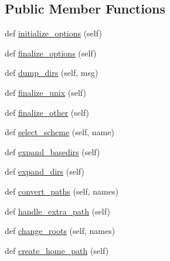 \subsection*{Public Member Functions}
\begin{DoxyCompactItemize}
\item 
def \hyperlink{classsetuptools_1_1__distutils_1_1command_1_1install_1_1install_ad08033d523b4e940dcf2356ae1c72f73}{initialize\+\_\+options} (self)
\item 
def \hyperlink{classsetuptools_1_1__distutils_1_1command_1_1install_1_1install_a57fd33667f362fe438802b3e810249fa}{finalize\+\_\+options} (self)
\item 
def \hyperlink{classsetuptools_1_1__distutils_1_1command_1_1install_1_1install_a20b972307ec79888cfdc313f1ff337c8}{dump\+\_\+dirs} (self, msg)
\item 
def \hyperlink{classsetuptools_1_1__distutils_1_1command_1_1install_1_1install_a87fb2450c2963cc2d94cc4b11f9ae995}{finalize\+\_\+unix} (self)
\item 
def \hyperlink{classsetuptools_1_1__distutils_1_1command_1_1install_1_1install_a416de9ef1a606dbd1366842c6f1dc7c3}{finalize\+\_\+other} (self)
\item 
def \hyperlink{classsetuptools_1_1__distutils_1_1command_1_1install_1_1install_aa23fd0b4b7c4a2e5ef1d720df6d363c6}{select\+\_\+scheme} (self, name)
\item 
def \hyperlink{classsetuptools_1_1__distutils_1_1command_1_1install_1_1install_ab844fb612e71fdc64c8be1126eb63659}{expand\+\_\+basedirs} (self)
\item 
def \hyperlink{classsetuptools_1_1__distutils_1_1command_1_1install_1_1install_adc5a9c1f8999a123bfa6b8045ae00713}{expand\+\_\+dirs} (self)
\item 
def \hyperlink{classsetuptools_1_1__distutils_1_1command_1_1install_1_1install_a2081d4bb6efd2679b4f62a884a1b550b}{convert\+\_\+paths} (self, names)
\item 
def \hyperlink{classsetuptools_1_1__distutils_1_1command_1_1install_1_1install_a10ef32eaccc1b7deb80ae818a51ec96e}{handle\+\_\+extra\+\_\+path} (self)
\item 
def \hyperlink{classsetuptools_1_1__distutils_1_1command_1_1install_1_1install_a74f0fc4bffdbca57c34e331c57f17e05}{change\+\_\+roots} (self, names)
\item 
def \hyperlink{classsetuptools_1_1__distutils_1_1command_1_1install_1_1install_af753e1533d657069a5c3bc9822a86a7a}{create\+\_\+home\+\_\+path} (self)
\item 

\end{DoxyCompactItemize}
